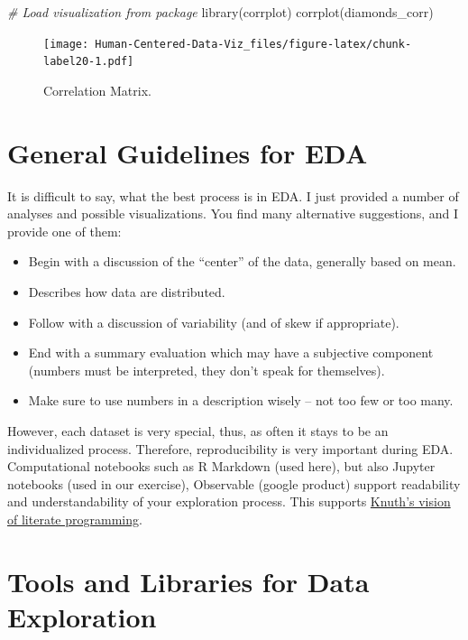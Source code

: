 \documentclass[
]{book}
\newenvironment{Shaded}{\begin{snugshade}}{\end{snugshade}}
\newcommand{\CommentTok}[1]{\textcolor[rgb]{0.56,0.35,0.01}{\textit{#1}}}
\newcommand{\FunctionTok}[1]{\textcolor[rgb]{0.00,0.00,0.00}{#1}}
\newcommand{\NormalTok}[1]{#1}
\providecommand{\tightlist}{%
  \setlength{\itemsep}{0pt}\setlength{\parskip}{0pt}}
\begin{document}
\begin{Shaded}
\begin{Highlighting}[]
\CommentTok{\# Load visualization from package}
\FunctionTok{library}\NormalTok{(corrplot)}
\FunctionTok{corrplot}\NormalTok{(diamonds\_corr)}
\end{Highlighting}
\end{Shaded}

\begin{figure}
\centering
\texttt{[image: Human-Centered-Data-Viz\_files/figure-latex/chunk-label20-1.pdf]}
\caption{\label{fig:chunk-label20}Correlation Matrix.}
\end{figure}

\hypertarget{general-guidelines-for-eda}{%
\section{General Guidelines for EDA}\label{general-guidelines-for-eda}}

It is difficult to say, what the best process is in EDA. I just provided a number of analyses and possible visualizations. You find many alternative suggestions, and I provide one of them:

\begin{itemize}
\tightlist
\item
  Begin with a discussion of the ``center'' of the data, generally based on mean.
\item
  Describes how data are distributed.
\item
  Follow with a discussion of variability (and of skew if appropriate).
\item
  End with a summary evaluation which may have a subjective component (numbers must be interpreted, they don't speak for themselves).
\item
  Make sure to use numbers in a description wisely -- not too few or too many.
\end{itemize}

However, each dataset is very special, thus, as often it stays to be an individualized process. Therefore, reproducibility is very important during EDA. Computational notebooks such as R Markdown (used here), but also Jupyter notebooks (used in our exercise), Observable (google product) support readability and understandability of your exploration process. This supports \href{https://en.wikipedia.org/wiki/Literate_programming}{Knuth's vision of literate programming}.

\hypertarget{tools-and-libraries-for-data-exploration}{%
\section{Tools and Libraries for Data Exploration}\label{tools-and-libraries-for-data-exploration}}
\end{document}
